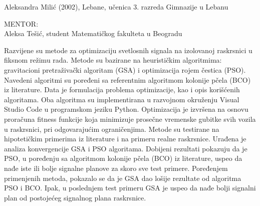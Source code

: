 \begin{AuthorEx}
Aleksandra Milić (2002), Lebane, učenica 3. razreda Gimnazije u Lebanu

MENTOR:\\
Aleksa Tešić, student Matematičkog fakulteta u Beogradu
\end{AuthorEx}
\begin{Abstract}
Razvijene su metode za optimizaciju svetlosnih signala na izolovanoj raskrsnici u fiksnom režimu rada. Metode su bazirane na heurističkim algoritmima: gravitacioni pretraživački algoritam (GSA) i optimizacija rojem čestica (PSO). Navedeni algoritmi su poređeni sa referentnim algoritmom kolonije pčela (BCO) iz literature. Data je formulacija problema optimizacije, kao i opis korišćenih algoritama. Oba algoritma su implementirana u razvojnom okruženju Visual Studio Code u programskom jeziku Python. Optimizacija je izvršena na osnovu proračuna fitness funkcije koja minimizuje prosečne vremenske gubitke svih vozila u raskrsnici, pri odgovarajućim ograničenjima. Metode su testirane na hipotetičkim primerima iz literature i na primeru realne raskrsnice. Urađena je analiza konvergencije GSA i PSO algoritama. Dobijeni rezultati pokazuju da je PSO, u poređenju sa algoritmom kolonije pčela (BCO) iz literature, uspeo da nađe iste ili bolje signalne planove za skoro sve test primere. Poređenjem primenjenih metoda, pokazalo se da je GSA dao lošije rezultate od algoritma PSO i BCO. Ipak, u poslednjem test primeru GSA je uspeo da nađe bolji signalni plan od postojećeg signalnog plana raskrsnice.
\end{Abstract}
